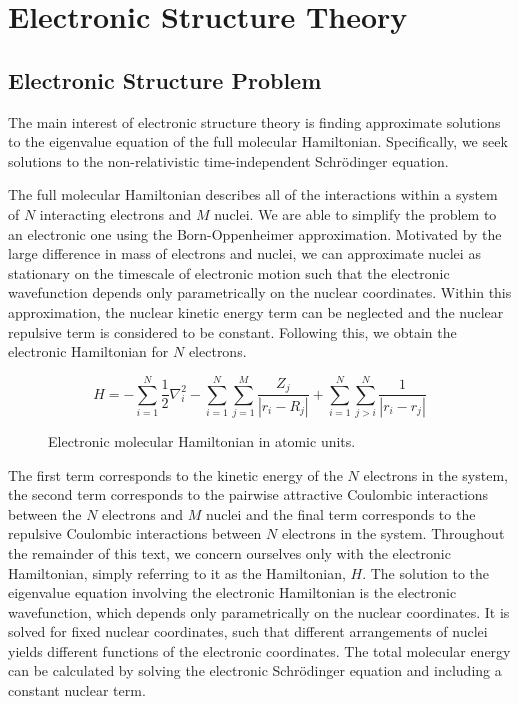 \section{\label{electronic-structure-theory}Electronic Structure Theory}

\subsection{Electronic Structure Problem}


The main interest of electronic structure theory is finding approximate solutions to the eigenvalue equation of the full molecular Hamiltonian. Specifically, we seek solutions to the non-relativistic time-independent Schrödinger equation.

The full molecular Hamiltonian describes all of the interactions within a system of $N$ interacting electrons and $M$ nuclei. We are able to simplify the problem to an electronic one using the Born-Oppenheimer approximation. Motivated by the large difference in mass of electrons and nuclei, we can approximate nuclei as stationary on the timescale of electronic motion such that the electronic wavefunction depends only parametrically on the nuclear coordinates. Within this approximation, the nuclear kinetic energy term can be neglected and the nuclear repulsive term is considered to be constant. Following this, we obtain the electronic Hamiltonian for $N$ electrons.

\begin{figure}[H]
\begin{equation*}
    H =
    - \sum_{i=1}^{N} \frac{1}{2} \nabla^{2}_{i}
    - \sum_{i=1}^{N} \sum_{j=1}^{M} \frac{Z_j}{|r_{i} - R_{j}|}
    + \sum_{i=1}^{N} \sum_{j>i}^{N} \frac{1}{|r_{i} - r_{j}|}
\end{equation*}
\caption{Electronic molecular Hamiltonian in atomic units.}
\end{figure}

The first term corresponds to the kinetic energy of the $N$ electrons in the system, the second term corresponds to the pairwise attractive Coulombic interactions between the $N$ electrons and $M$ nuclei and the final term corresponds to the repulsive Coulombic interactions between $N$ electrons in the system. Throughout the remainder of this text, we concern ourselves only with the electronic Hamiltonian, simply referring to it as the Hamiltonian, $H$. The solution to the eigenvalue equation involving the electronic Hamiltonian is the electronic wavefunction, which depends only parametrically on the nuclear coordinates. It is solved for fixed nuclear coordinates, such that different arrangements of nuclei yields different functions of the electronic coordinates. The total molecular energy can be calculated by solving the electronic Schrödinger equation and including a constant nuclear term.

